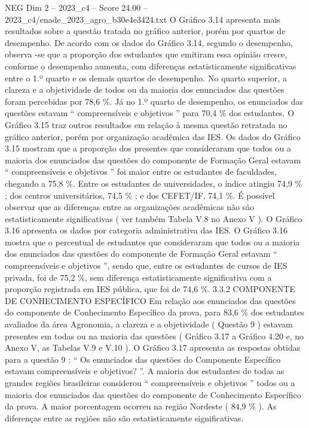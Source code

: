 \begin{textsample}{NEG Dim 2 – 2023\_c4 – Score 24.00 – 2023\_c4/enade\_2023\_agro\_b30e4e3424.txt}
O Gráfico 3.14 apresenta mais resultados sobre a questão tratada no gráfico anterior, porém por quartos de desempenho.
De acordo com os dados do Gráfico 3.14, segundo o desempenho, observa -se que a proporção dos estudantes que emitiram essa opinião cresce, conforme o desempenho aumenta, com diferenças estatisticamente significativas entre o 1.º quarto e os demais quartos de desempenho.
No quarto superior, a clareza e a objetividade de todos ou da maioria dos enunciados das questões foram percebidas por 78,6 \%.
Já no 1.º quarto de desempenho, os enunciados das questões estavam “ compreensíveis e objetivos ” para 70,4 \% dos estudantes.
O Gráfico 3.15 traz outros resultados em relação à mesma questão retratada no gráfico anterior, porém por organização acadêmica das IES.
Os dados do Gráfico 3.15 mostram que a proporção dos presentes que consideraram que todos ou a maioria dos enunciados das questões do componente de Formação Geral estavam “ compreensíveis e objetivos ” foi maior entre os estudantes de faculdades, chegando a 75,8 \%.
Entre os estudantes de universidades, o índice atingiu 74,9 \% ; dos centros universitários, 74,5 \% ; e dos CEFET/IF, 74,1 \%.
É possível observar que as diferenças entre as organizações acadêmicas não são estatisticamente significativas ( ver também Tabela V.8 no Anexo V ).
O Gráfico 3.16 apresenta os dados por categoria administrativa das IES.
O Gráfico 3.16 mostra que o percentual de estudantes que consideraram que todos ou a maioria dos enunciados das questões do componente de Formação Geral estavam “ compreensíveis e objetivos ”, sendo que, entre os estudantes de cursos de IES privada, foi de 75,2 \%, sem diferença estatisticamente significativa com a proporção registrada em IES pública, que foi de 74,6 \%. 3.3.2 COMPONENTE DE CONHECIMENTO ESPECÍFICO Em relação aos enunciados das questões do componente de Conhecimento Específico da prova, para 83,6 \% dos estudantes avaliados da área Agronomia, a clareza e a objetividade ( Questão 9 ) estavam presentes em todas ou na maioria das questões ( Gráfico 3.17 a Gráfico 4.20 e, no Anexo V, as Tabelas V.9 e V.10 ).
O Gráfico 3.17 apresenta as respostas obtidas para a questão 9 : “ Os enunciados das questões do Componente Específico estavam compreensíveis e objetivos? ”.
A maioria dos estudantes de todas as grandes regiões brasileiras considerou “ compreensíveis e objetivos ” todos ou a maioria dos enunciados das questões do componente de Conhecimento Específico da prova.
A maior porcentagem ocorreu na região Nordeste ( 84,9 \% ).
As diferenças entre as regiões não são estatisticamente significativas.

\end{textsample}
